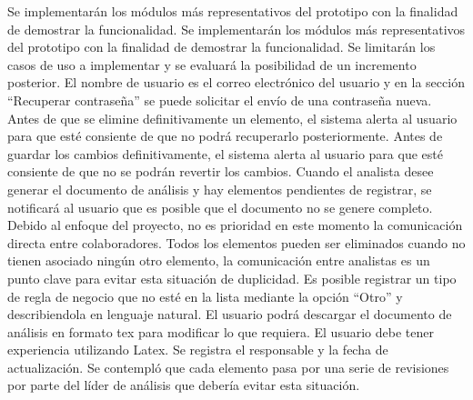 \clearpage
\begin{riesgos}
		{Se implementarán los módulos más representativos del prototipo con la finalidad de demostrar la funcionalidad.}
		{Se implementarán los módulos más representativos del prototipo con la finalidad de demostrar la funcionalidad.}
		{Se limitarán los casos de uso a implementar y se evaluará la posibilidad de un incremento posterior.}
		{El nombre de usuario es el correo electrónico del usuario y en la sección ``Recuperar contraseña'' se puede solicitar el envío de una contraseña nueva.}
		{Antes de que se elimine definitivamente un elemento, el sistema alerta al usuario para que esté consiente de que no podrá recuperarlo posteriormente.}
		{Antes de guardar los cambios definitivamente, el sistema alerta al usuario para que esté consiente de que no se podrán revertir los cambios.}
		{Cuando el analista desee generar el documento de análisis y hay elementos pendientes de registrar, se notificará al usuario que es posible que el documento 
		no se genere completo.}
		{Debido al enfoque del proyecto, no es prioridad en este momento la comunicación directa entre colaboradores.}
 		{Todos los elementos pueden ser eliminados cuando no tienen asociado ningún otro elemento, la comunicación entre analistas es un punto clave para evitar esta situación de duplicidad.}
 		{Es posible registrar un tipo de regla de negocio que no esté en la lista mediante la opción ``Otro'' y describiendola en lenguaje natural.}
 		{El usuario podrá descargar el documento de análisis en formato tex para modificar lo que requiera. El usuario debe tener experiencia utilizando Latex.}
		{Se registra el responsable y la fecha de actualización.}
		{Se contempló que cada elemento pasa por una serie de revisiones por parte del líder de análisis que debería evitar esta situación.}
	
\end{riesgos}



